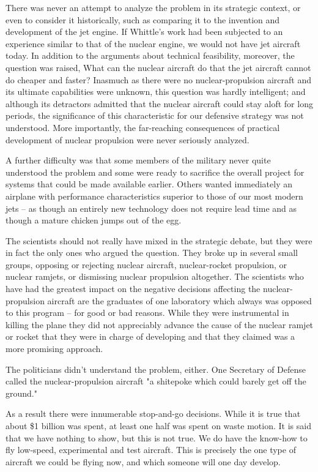 \documentclass[a4paper,12pt]{book}
\begin{document}
There was never an attempt to analyze the problem in its strategic context, or even to consider it historically, such as comparing it to the invention and development of the jet engine. If Whittle's work had been subjected to an experience similar to that of the nuclear engine, we would not have jet aircraft today. In addition to the arguments about technical feasibility, moreover, the question was raised, What can the nuclear aircraft do that the jet aircraft cannot do cheaper and faster? Inasmuch as there were no nuclear-propulsion aircraft and its ultimate capabilities were unknown, this question was hardly intelligent; and although its detractors admitted that the nuclear aircraft could stay aloft for long periods, the significance of this characteristic for our defensive strategy was not understood. More importantly, the far-reaching consequences of practical development of nuclear propulsion were never seriously analyzed.

A further difficulty was that some members of the military never quite understood the problem and some were ready to sacrifice the overall project for systems that could be made available earlier. Others wanted immediately an airplane with performance characteristics superior to those of our most modern jets -- as though an entirely new technology does not require lead time and as though a mature chicken jumps out of the egg.

The scientists should not really have mixed in the strategic debate, but they were in fact the only ones who argued the question. They broke up in several small groups, opposing or rejecting nuclear aircraft, nuclear-rocket propulsion, or nuclear ramjets, or dismissing nuclear propulsion altogether. The scientists who have had the greatest impact on the negative decisions affecting the nuclear-propulsion aircraft are the graduates of one laboratory which always was opposed to this program -- for good or bad reasons. While they were instrumental in killing the plane they did not appreciably advance the cause of the nuclear ramjet or rocket that they were in charge of developing and that they claimed was a more promising approach.

The politicians didn't understand the problem, either. One Secretary of Defense called the nuclear-propulsion aircraft "a shitepoke which could barely get off the ground."

As a result there were innumerable stop-and-go decisions. While it is true that about \$1 billion was spent, at least one half was spent on waste motion. It is said that we have nothing to show, but this is not true. We do have the know-how to fly low-speed, experimental and test aircraft. This is precisely the one type of aircraft we could be flying now, and which someone will one day develop.
\end{document}
